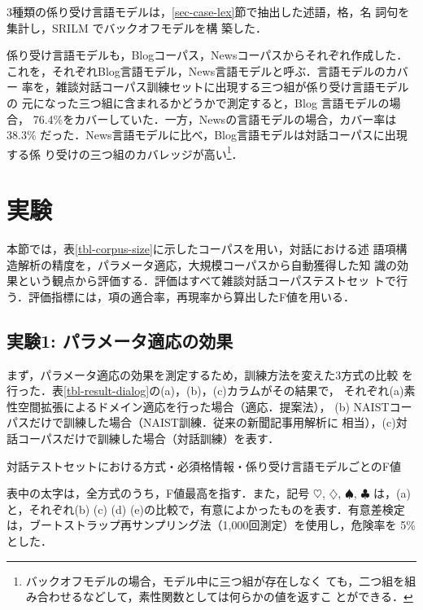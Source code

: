 \documentclass[japanese]{jnlp_1.4}
\begin{document}
3種類の係り受け言語モデルは，\ref{sec-case-lex}節で抽出した述語，格，名
詞句を集計し，SRILM \cite{Stolcke:SRILM2011}でバックオフモデルを構
築した．

係り受け言語モデルも，Blogコーパス，Newsコーパスからそれぞれ作成した．
これを，それぞれBlog言語モデル，News言語モデルと呼ぶ．言語モデルのカバー
率を，雑談対話コーパス訓練セットに出現する三つ組が係り受け言語モデルの
元になった三つ組に含まれるかどうかで測定すると，Blog 言語モデルの場合，
76.4\%をカバーしていた．一方，Newsの言語モデルの場合，カバー率は38.3\%
だった．News言語モデルに比べ，Blog言語モデルは対話コーパスに出現する係
り受けの三つ組のカバレッジが高い\footnote{バックオフモデルの場合，モデル中に三つ組が存在しなく
ても，二つ組を組み合わせるなどして，素性関数としては何らかの値を返すこ
とができる．}．


\section{実験}
\label{sec-experiments}

本節では，表\ref{tbl-corpus-size}に示したコーパスを用い，対話における述
語項構造解析の精度を，パラメータ適応，大規模コーパスから自動獲得した知
識の効果という観点から評価する．評価はすべて雑談対話コーパステストセッ
トで行う．評価指標には，項の適合率，再現率から算出したF値を用いる．


\subsection{実験1: パラメータ適応の効果}
\label{sec-exp-parameter-adaptation}

まず，パラメータ適応の効果を測定するため，訓練方法を変えた3方式の比較
を行った．表\ref{tbl-result-dialog}の(a)，(b)，(c)カラムがその結果で，
それぞれ(a)素性空間拡張によるドメイン適応を行った場合（適応．提案法），
(b) NAISTコーパスだけで訓練した場合（NAIST訓練．従来の新聞記事用解析に
相当），(c)対話コーパスだけで訓練した場合（対話訓練）を表す．

\begin{table}[b]
\caption{対話テストセットにおける方式・必須格情報・係り受け言語モデルごとのF値}
\label{tbl-result-dialog}

\par\vspace{8pt}\small
表中の太字は，全方式のうち，F値最高を指す．また，記号 $\heartsuit$, $\diamondsuit$, $\spadesuit$, $\clubsuit$ は，(a)
と，それぞれ(b) (c) (d) (e)の比較で，有意によかったものを表す．有意差検定は，ブートストラップ再サンプリング法（1,000回測定）を使用し，危険率を
5\%とした．
\end{table}
\end{document}
